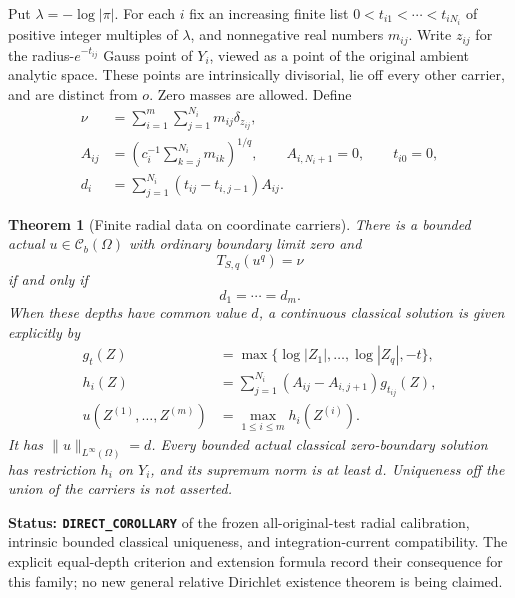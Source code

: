 \documentclass[11pt,a4paper]{article}
\numberwithin{equation}{section}
\newtheorem{theorem}{Theorem}[section]
\theoremstyle{definition}
\theoremstyle{remark}
\begin{document}
Put $\lambda=-\log|\pi|$. For each $i$ fix an increasing finite
list $0<t_{i1}<\cdots<t_{iN_i}$ of positive integer multiples of
$\lambda$, and nonnegative real numbers $m_{ij}$. Write $z_{ij}$
for the radius-$e^{-t_{ij}}$ Gauss point of $Y_i$, viewed as a point
of the original ambient analytic space. These points are intrinsically
divisorial, lie off every other carrier, and are distinct from $o$.
Zero masses are allowed. Define
\begin{align}
 \nu&=\sum_{i=1}^m\sum_{j=1}^{N_i}m_{ij}\delta_{z_{ij}},
       \label{eq:r6-radial-carrier-data}\\
 A_{ij}&=\left(c_i^{-1}\sum_{k=j}^{N_i}m_{ik}\right)^{1/q},
       \qquad A_{i,N_i+1}=0,\qquad t_{i0}=0,\\
 d_i&=\sum_{j=1}^{N_i}(t_{ij}-t_{i,j-1})A_{ij}.
       \label{eq:r6-radial-carrier-depth}
\end{align}

\begin{theorem}[Finite radial data on coordinate carriers]
\label{thm:r6-radial-carrier-solvability}
There is a bounded actual $u\in\mathcal C_b(\Omega)$ with ordinary
boundary limit zero and
\[
                         T_{S,q}(u^q)=\nu
\]
if and only if
\[
                              d_1=\cdots=d_m.
\]
When these depths have common value $d$, a continuous classical
solution is given explicitly by
\begin{align}
 g_t(Z)&=\max\{\log|Z_1|,\ldots,\log|Z_q|,-t\},\\
 h_i(Z)&=\sum_{j=1}^{N_i}(A_{ij}-A_{i,j+1})g_{t_{ij}}(Z),
       \label{eq:r6-radial-carrier-intrinsic-solution}\\
 u(Z^{(1)},\ldots,Z^{(m)})&=\max_{1\le i\le m}h_i(Z^{(i)}).
       \label{eq:r6-radial-carrier-ambient-solution}
\end{align}
It has $\|u\|_{L^\infty(\Omega)}=d$. Every bounded actual classical
zero-boundary solution has restriction $h_i$ on $Y_i$, and its
supremum norm is at least $d$. Uniqueness off the union of the
carriers is not asserted.
\end{theorem}

\noindent\textbf{Status: \texttt{DIRECT\_COROLLARY}} of the
frozen all-original-test radial calibration, intrinsic bounded
classical uniqueness, and integration-current compatibility.
The explicit equal-depth criterion and extension formula record
their consequence for this family; no new general relative
Dirichlet existence theorem is being claimed.
\end{document}
